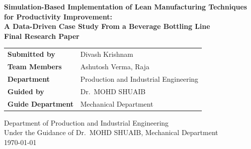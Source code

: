 \documentclass[12pt,a4paper]{article}
\begin{document}
\begin{titlepage}
\centering

{\Large \textbf{Simulation-Based Implementation of Lean Manufacturing Techniques for Productivity Improvement:}}\\[0.3cm]
{\Large \textbf{A Data-Driven Case Study From a Beverage Bottling Line}}\\[1.2cm]

{\large \textbf{Final Research Paper}}\\[1cm]

\begin{tabular}{>{\bfseries}p{4.2cm}p{9.5cm}}
Submitted by & Divash Krishnam \\
Team Members & Ashutosh Verma, Raja \\
Department & Production and Industrial Engineering \\
Guided by & Dr.\ MOHD SHUAIB \\
Guide Department & Mechanical Department \\
\end{tabular}

\vfill

{\large Department of Production and Industrial Engineering}\\[0.2cm]
{\large Under the Guidance of Dr.\ MOHD SHUAIB, Mechanical Department}\\[0.8cm]
{\large \today}

\end{titlepage}

\tableofcontents
\newpage
\end{document}
